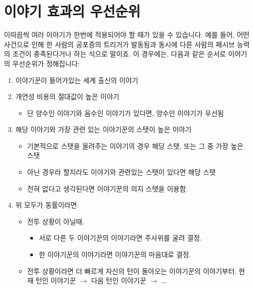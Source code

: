 \documentclass{report}
\begin{document}
	\section*{이야기 효과의 우선순위}
	이따끔씩 여러 이야기가 한번에 적용되어야 할 때가 있을 수 있습니다. 예를 들어, 어떤 사건으로 인해 한 사람의 공포증의 트리거가 발동됨과 동시에 다른 사람의 패시브 능력의 조건이 충족된다거나 하는 식으로 말이죠. 이 경우에는, 다음과 같은 순서로 이야기의 우선순위가 정해집니다:
	\begin{enumerate}
		\item 이야기꾼이 들어가있는 세계 출신의 이야기
		\item 개연성 비용의 절대값이 높은 이야기
		\begin{itemize}
			\item 단 양수인 이야기와 음수인 이야기가 있다면, 양수인 이야기가 우선됨
		\end{itemize}
		\item 해당 이야기와 가장 관련 있는 이야기꾼의 스탯이 높은 이야기
		\begin{itemize}
			\item 기본적으로 스탯을 올려주는 이야기의 경우 해당 스탯, 또는 그 중 가장 높은 스탯
			\item 아닌 경우라 할지라도 이야기와 관련있는 스탯이 있다면 해당 스탯
			\item 전혀 없다고 생각된다면 이야기꾼의 의지 스탯을 이용함.
		\end{itemize}
		\item 위 모두가 동률이라면:
		\begin{itemize}
			\item 전투 상황이 아닐때, 
			\begin{itemize}
				\item 서로 다른 두 이야기꾼의 이야기라면 주사위를 굴려 결정.
				\item 한 이야기꾼의 이야기라면 이야기꾼의 마음대로 결정.
			\end{itemize}
			\item 전투 상황이라면 더 빠르게 자신의 턴이 돌아오는 이야기꾼의 이야기부터.
			\subitem 현재 턴인 이야기꾼 $\rightarrow$ 다음 턴인 이야기꾼 $\rightarrow$ ...
		\end{itemize}
	\end{enumerate}
	
\end{document}
